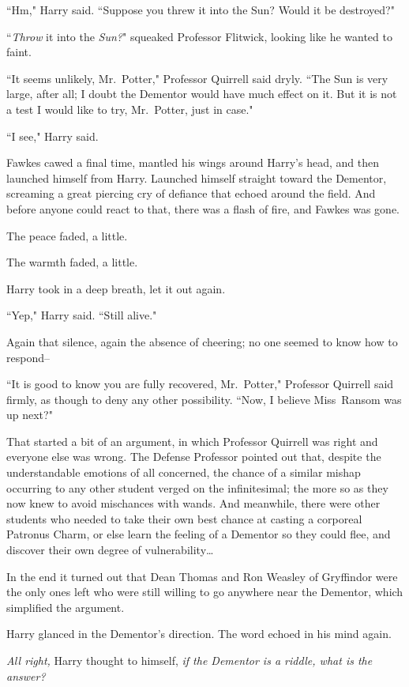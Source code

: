 ``Hm," Harry said. ``Suppose you threw it into the Sun? Would it be destroyed?"

``\emph{Throw} it into the \emph{Sun?}" squeaked Professor Flitwick, looking like he wanted to faint.

``It seems unlikely, Mr.~Potter," Professor Quirrell said dryly. ``The Sun is very large, after all; I doubt the Dementor would have much effect on it. But it is not a test I would like to try, Mr.~Potter, just in case."

``I see," Harry said.

Fawkes cawed a final time, mantled his wings around Harry's head, and then launched himself from Harry. Launched himself straight toward the Dementor, screaming a great piercing cry of defiance that echoed around the field. And before anyone could react to that, there was a flash of fire, and Fawkes was gone.

The peace faded, a little.

The warmth faded, a little.

Harry took in a deep breath, let it out again.

``Yep," Harry said. ``Still alive."

Again that silence, again the absence of cheering; no one seemed to know how to respond\---

``It is good to know you are fully recovered, Mr.~Potter," Professor Quirrell said firmly, as though to deny any other possibility. ``Now, I believe Miss~Ransom was up next?"

That started a bit of an argument, in which Professor Quirrell was right and everyone else was wrong. The Defense Professor pointed out that, despite the understandable emotions of all concerned, the chance of a similar mishap occurring to any other student verged on the infinitesimal; the more so as they now knew to avoid mischances with wands. And meanwhile, there were other students who needed to take their own best chance at casting a corporeal Patronus Charm, or else learn the feeling of a Dementor so they could flee, and discover their own degree of vulnerability{\ldots}

In the end it turned out that Dean Thomas and Ron Weasley of Gryffindor were the only ones left who were still willing to go anywhere near the Dementor, which simplified the argument.

Harry glanced in the Dementor's direction. The word echoed in his mind again.

\emph{All right,} Harry thought to himself, \emph{if the Dementor is a riddle, what is the answer?}

